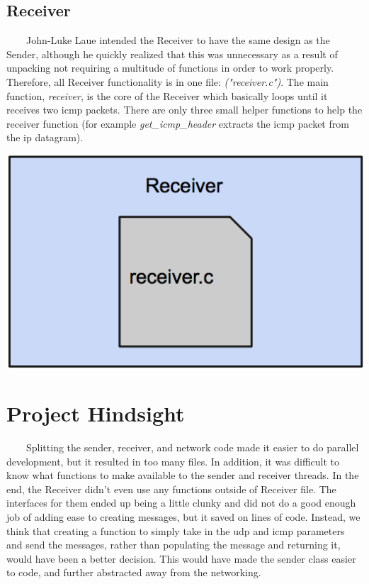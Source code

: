 \documentclass[11pt]{article}
\begin{document}
\subsection{Receiver}
\ \ \ \ John-Luke Laue intended the Receiver to have the same design as the Sender, although he quickly realized that this was unnecessary as a result of unpacking not requiring a multitude of functions in order to work properly. Therefore, all Receiver functionality is in one file: \textit{("receiver.c")}. The main function,  \textit{receiver}, is the core of the Receiver which basically loops until it receives two icmp packets. There are only three small helper functions to help the receiver function (for example \textit{get\_icmp\_header} extracts the icmp packet from the ip datagram).
\begin{center}
\includegraphics[scale=0.3]{images/receiver-design.png}
\end{center}

\section{Project Hindsight}
\ \ \ \ Splitting the sender, receiver, and network code made it easier to do parallel development, but it resulted in too many files. In addition, it was difficult to know what functions to make available to the sender and receiver threads. In the end, the Receiver didn't even use any functions outside of Receiver file. The interfaces for them ended up being a little clunky and did not do a good enough job of adding ease to creating messages, but it saved on lines of code.  Instead, we think that creating a function to simply take in the udp and icmp parameters and send the messages, rather than populating the message and returning it, would have been a better decision. This would have made the sender class easier to code, and further abstracted away from the networking. 
\ \ \ \ 
\end{document}
